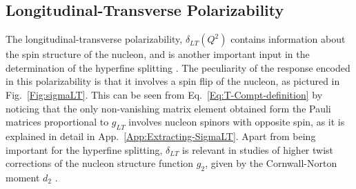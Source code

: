 \documentclass[twocolumn,prc,showpacs,nofootinbib,preprintnumbers,amsmath,amssymb,superscriptaddress]{revtex4-1}
\begin{document}
\subsection{Longitudinal-Transverse Polarizability}
\label{Sec:LongitudinalTransversePolarizability}

The longitudinal-transverse polarizability, $\delta_{LT}(Q^2)$ contains information about the spin structure of the nucleon, and is another important input in the determination of the hyperfine splitting \cite{Carlson:2008ke}. 
The peculiarity of the response encoded in this polarizability is that it involves a spin flip of the nucleon, as pictured in Fig.~\ref{Fig:sigmaLT}.
This can be seen from Eq.~\eqref{Eq:T-Compt-definition} by noticing that the only non-vanishing matrix element obtained form the Pauli matrices proportional to $g_{LT}$ involves nucleon spinors with opposite spin, as it is explained in detail in App.~\ref{App:Extracting-SigmaLT}.
Apart from being important for the hyperfine splitting, $\delta_{LT}$ is relevant in studies of higher twist corrections of the nucleon structure function $g_2$, given by the Cornwall-Norton moment $d_2$ \cite{Kao:2003jd}. 
\end{document}
